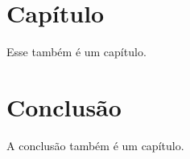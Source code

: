 \documentclass[tcc/ec]{faeng}
\begin{document}
\listailustracoes

\listatabelas


\sumario

\mainmatter


\chapter[Capítulo]{Capítulo}
Esse também é um capítulo.

\chapter[Conclusão]{Conclusão}
A conclusão também é um capítulo.
\end{document}
